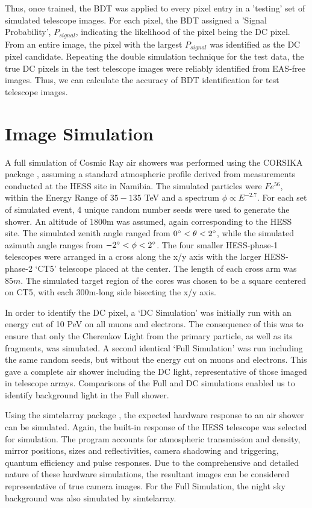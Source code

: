 \documentclass[]{article}
\begin{document}
Thus, once trained, the BDT was applied to every pixel entry in a 'testing' set of simulated telescope images. For each pixel, the BDT assigned a 'Signal Probability', $P_{signal}$, indicating the likelihood of the pixel being the DC pixel. From an entire image, the pixel with the largest $P_{signal}$ was identified as the DC pixel candidate. Repeating the double simulation technique for the test data, the true DC pixels in the test telescope images were reliably identified from EAS-free images. Thus, we can calculate the accuracy of BDT identification for test telescope images.

\section{Image Simulation}
A full simulation of Cosmic Ray air showers was performed using the CORSIKA package \cite{Heck98}, assuming a standard atmospheric profile derived from measurements conducted at the HESS site in Namibia. The simulated particles were $Fe^{56}$, within the Energy Range of $35-135$ TeV and a spectrum $\phi \propto E^{-2.7}$. For each set of simulated event, 4 unique random number seeds were used to generate the shower. An altitude of 1800m was assumed, again corresponding to the HESS site. The simulated zenith angle ranged from $0\degree < \theta < 2 \degree$, while the simulated azimuth angle ranges from $-2\degree < \phi < 2 \degree$. The four smaller HESS-phase-1 telescopes were arranged in a cross along the x/y axis with the larger HESS-phase-2 \textquoteleft CT5' telescope placed at the center. The length of each cross arm was $85m$. The simulated target region of the cores was chosen to be a square centered on CT5, with each 300m-long side bisecting the x/y axis.

In order to identify the DC pixel, a \textquoteleft DC Simulation' was initially run with an energy cut of 10 PeV on all muons and electrons. The consequence of this was to ensure that only the Cherenkov Light from the primary particle, as well as its fragments, was simulated. A second identical \textquoteleft Full Simulation' was run including the same random seeds, but without the energy cut on muons and electrons. This gave a complete air shower including the DC light, representative of those imaged in telescope arrays. Comparisons of the Full and DC simulations enabled us to identify background light in the Full shower.

Using the sim\textunderscore telarray package \cite{Bernlohr08}, the expected hardware response to an air shower can be simulated. Again, the built-in response of the HESS telescope was selected for simulation. The program accounts for atmospheric transmission and density, mirror positions, sizes and reflectivities, camera shadowing and triggering, quantum efficiency and pulse responses. Due to the comprehensive and detailed nature of these hardware simulations, the resultant images can be considered representative of true camera images. For the Full Simulation, the night sky background was also simulated by sim\textunderscore telarray.
\end{document}
